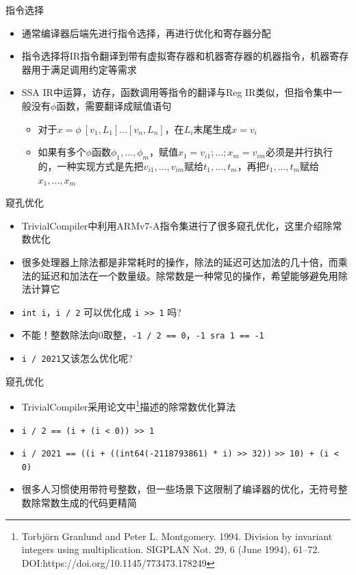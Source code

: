 \documentclass{beamer}
\begin{document}
\begin{frame}{指令选择}
\begin{itemize}
  \item 通常编译器后端先进行指令选择，再进行优化和寄存器分配
  \item 指令选择将IR指令翻译到带有虚拟寄存器和机器寄存器的机器指令，机器寄存器用于满足调用约定等需求
  \item SSA IR中运算，访存，函数调用等指令的翻译与Reg IR类似，但指令集中一般没有$\phi$函数，需要翻译成赋值语句
  \begin{itemize}
    \item 对于$x = \phi\ [v_1, L_1] \ldots [v_n, L_n]$，在$L_i$末尾生成$x = v_i$
    \item 如果有多个$\phi$函数$\phi_1, ..., \phi_m$，赋值$x_1 = v_{i1}; \ldots; x_m = v_{im}$必须是并行执行的，一种实现方式是先把$v_{i1}, \ldots, v_{im}$赋给$t_1, \ldots, t_m$，再把$t_1, \ldots, t_m$赋给$x_1, \ldots, x_m$
  \end{itemize}
\end{itemize}
\end{frame}

\begin{frame}{窥孔优化}
\begin{itemize}
  \item TrivialCompiler中利用ARMv7-A指令集进行了很多窥孔优化，这里介绍除常数优化
  \item 很多处理器上除法都是非常耗时的操作，除法的延迟可达加法的几十倍，而乘法的延迟和加法在一个数量级。除常数是一种常见的操作，希望能够避免用除法计算它
  \item \lstinline|int i|，\lstinline|i / 2| 可以优化成 \lstinline|i >> 1| 吗?
  \pause
  \item 不能！整数除法向0取整，\lstinline|-1 / 2 == 0|，\lstinline|-1 sra 1 == -1|
  \item \lstinline|i / 2021|又该怎么优化呢?
\end{itemize}
\end{frame}

\begin{frame}{窥孔优化}
\begin{itemize}
  \item TrivialCompiler采用论文中\footnote[1]{Torbjörn Granlund and Peter L. Montgomery. 1994. Division by invariant integers using multiplication. SIGPLAN Not. 29, 6 (June 1994), 61–72. DOI:https://doi.org/10.1145/773473.178249}描述的除常数优化算法
  \item \lstinline|i / 2 == (i + (i < 0)) >> 1|
  \item \lstinline|i / 2021 == ((i + ((int64(-2118793861) * i) >> 32))| \lstinline|>> 10) + (i < 0)|
  \pause
  \item 很多人习惯使用带符号整数，但一些场景下这限制了编译器的优化，无符号整数除常数生成的代码更精简
\end{itemize}
\end{frame}
\end{document}
